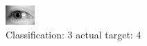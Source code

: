\begin{figure}[h!]
\begin{center}
\includegraphics[width=0.60\columnwidth]{figures/ID3146_class_3_target_4.png}
\end{center}
\caption{ Classification: 3 actual target: 4}
\label{fig:ID3146_class_3_target_4}
\end{figure}
